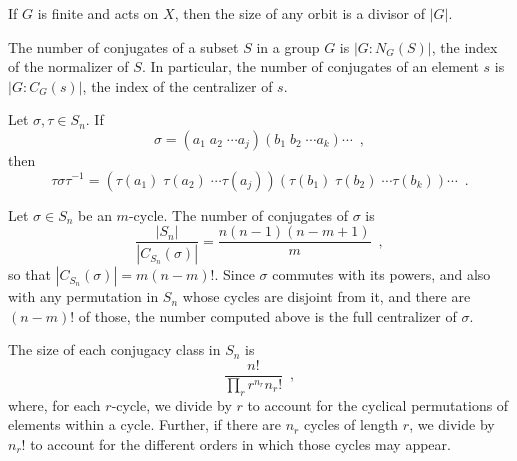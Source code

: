 \begin{corollary}
	\cite[103]{Rotman1967}
	If $G$ is finite and acts on $X$, then the size of any orbit is a divisor of $|G|$.
\end{corollary}

\begin{proposition}
	\cite[123]{DummitFoote2004}
	The number of conjugates of a subset $S$ in a group $G$ is $|G : N_G(S)|$, the index
	of the normalizer of $S$. In particular, the number of conjugates of an element $s$ is
	$|G : C_G(s)|$, the index of the centralizer of $s$.
\end{proposition}

\begin{proposition}
	\cite[125]{DummitFoote2004}
	Let $\sigma, \tau \in S_n$. If
	\begin{equation}
		\sigma = (a_1 \; a_2 \; \cdots a_j) (b_1 \; b_2 \; \cdots a_k) \cdots \enspace,
	\end{equation}
	then
	\begin{equation}
		\tau \sigma \tau^{-1} = (\tau(a_1) \; \tau(a_2) \; \cdots
		\tau(a_j)) (\tau(b_1) \; \tau(b_2) \; \cdots \tau(b_k)) \cdots \enspace.
	\end{equation}
\end{proposition}

\begin{example}
	\cite[127]{DummitFoote2004}
	Let $\sigma \in S_n$ be an $m$-cycle. The number of conjugates of $\sigma$ is
	\begin{equation}
		\frac{|S_n|}{|C_{S_n}(\sigma)|} = \frac{n (n - 1) (n - m + 1)}{m} \enspace,
	\end{equation}
	so that $|C_{S_n}(\sigma)| = m (n - m)!$. Since $\sigma$ commutes with its powers,
	and also with any permutation in $S_n$ whose cycles are disjoint from it, and there are
	$(n - m)!$ of those, the number computed above is the full centralizer of $\sigma$.
\end{example}

\begin{example}
	\cite[132]{DummitFoote2004}
	The size of each conjugacy class in $S_n$ is
	\begin{equation}
		\frac{n!}{\prod_{r}r^{n_r}n_r!} \enspace,
	\end{equation}
	where, for each $r$-cycle, we divide by $r$ to account for the cyclical permutations
	of elements within a cycle. Further, if there are $n_r$ cycles of length $r$, we divide
	by $n_r!$ to account for the different orders in which those cycles may appear.
\end{example}

